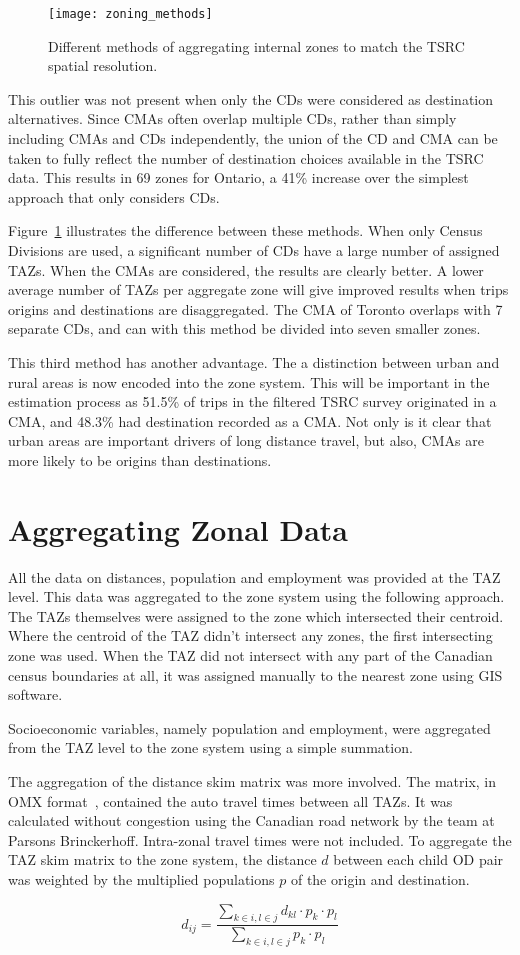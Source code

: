 \begin{figure}[H]
\centering
\texttt{[image: zoning\_methods]}
\caption{Different methods of aggregating internal zones to match the TSRC spatial resolution.}
\label{fig:zoning}
\end{figure}

This outlier was not present when only the CDs were considered as destination alternatives. Since CMAs often overlap multiple CDs, rather than simply including CMAs and CDs independently, the union of the CD and CMA can be taken to fully reflect the number of destination choices available in the TSRC data. This results in 69 zones for Ontario, a 41\% increase over the simplest approach that only considers CDs.

Figure~\ref{fig:zoning} illustrates the difference between these methods. When only Census Divisions are used, a significant number of CDs have a large number of assigned TAZs. When the CMAs are considered, the results are clearly better. A lower average number of TAZs per aggregate zone will give improved results when trips origins and destinations are disaggregated. The CMA of Toronto overlaps with 7 separate CDs, and can with this method be divided into seven smaller zones.

This third method has another advantage. The a distinction between urban and rural areas is now encoded into the zone system. This will be important in the estimation process as 51.5\% of trips in the filtered TSRC survey originated in a CMA, and 48.3\% had destination recorded as a CMA. Not only is it clear that urban areas are important drivers of long distance travel, but also, CMAs are more likely to be origins than destinations.


\section{Aggregating Zonal Data}
All the data on distances, population and employment was provided at the TAZ level. This data was aggregated to the zone system using the following approach. The TAZs themselves were assigned to the zone which intersected their centroid. Where the centroid of the TAZ didn't intersect any zones, the first intersecting zone was used. When the TAZ did not intersect with any part of the Canadian census boundaries at all, it was assigned manually to the nearest zone using GIS software.

Socioeconomic variables, namely population and employment, were aggregated from the TAZ level to the zone system using a simple summation.

The aggregation of the distance skim matrix was more involved. The matrix, in OMX format~\parencite{omx}, contained the auto travel times between all TAZs. It was calculated without congestion using the Canadian road network by the team at Parsons Brinckerhoff. Intra-zonal travel times were not included. To aggregate the TAZ skim matrix to the zone system, the distance $d$ between each child OD pair was weighted by the multiplied populations $p$ of the origin and destination. 

$$ d_{ij} = 
\frac{
\sum_{k \in i, l \in j} d_{kl} \cdot p_k \cdot p_l}
{
\sum_{k \in i, l \in j} p_k \cdot p_l
} 
$$

